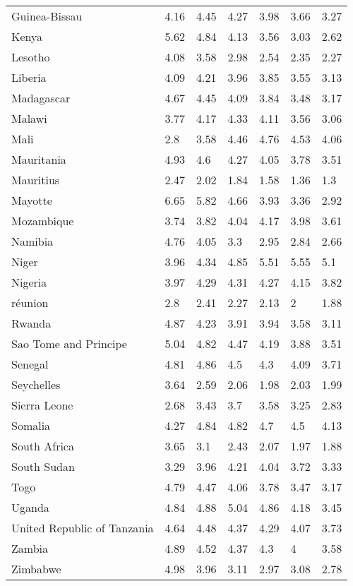 \begin{longtable}[t]{lllllll}
Guinea-Bissau & 4.16 & 4.45 & 4.27 & 3.98 & 3.66 & 3.27\\
Kenya & 5.62 & 4.84 & 4.13 & 3.56 & 3.03 & 2.62\\
Lesotho & 4.08 & 3.58 & 2.98 & 2.54 & 2.35 & 2.27\\
Liberia & 4.09 & 4.21 & 3.96 & 3.85 & 3.55 & 3.13\\
Madagascar & 4.67 & 4.45 & 4.09 & 3.84 & 3.48 & 3.17\\
Malawi & 3.77 & 4.17 & 4.33 & 4.11 & 3.56 & 3.06\\
Mali & 2.8 & 3.58 & 4.46 & 4.76 & 4.53 & 4.06\\
Mauritania & 4.93 & 4.6 & 4.27 & 4.05 & 3.78 & 3.51\\
Mauritius & 2.47 & 2.02 & 1.84 & 1.58 & 1.36 & 1.3\\
Mayotte & 6.65 & 5.82 & 4.66 & 3.93 & 3.36 & 2.92\\
Mozambique & 3.74 & 3.82 & 4.04 & 4.17 & 3.98 & 3.61\\
Namibia & 4.76 & 4.05 & 3.3 & 2.95 & 2.84 & 2.66\\
Niger & 3.96 & 4.34 & 4.85 & 5.51 & 5.55 & 5.1\\
Nigeria & 3.97 & 4.29 & 4.31 & 4.27 & 4.15 & 3.82\\
réunion & 2.8 & 2.41 & 2.27 & 2.13 & 2 & 1.88\\
Rwanda & 4.87 & 4.23 & 3.91 & 3.94 & 3.58 & 3.11\\
Sao Tome and Principe & 5.04 & 4.82 & 4.47 & 4.19 & 3.88 & 3.51\\
Senegal & 4.81 & 4.86 & 4.5 & 4.3 & 4.09 & 3.71\\
Seychelles & 3.64 & 2.59 & 2.06 & 1.98 & 2.03 & 1.99\\
Sierra Leone & 2.68 & 3.43 & 3.7 & 3.58 & 3.25 & 2.83\\
Somalia & 4.27 & 4.84 & 4.82 & 4.7 & 4.5 & 4.13\\
South Africa & 3.65 & 3.1 & 2.43 & 2.07 & 1.97 & 1.88\\
South Sudan & 3.29 & 3.96 & 4.21 & 4.04 & 3.72 & 3.33\\
Togo & 4.79 & 4.47 & 4.06 & 3.78 & 3.47 & 3.17\\
Uganda & 4.84 & 4.88 & 5.04 & 4.86 & 4.18 & 3.45\\
United Republic of Tanzania & 4.64 & 4.48 & 4.37 & 4.29 & 4.07 & 3.73\\
Zambia & 4.89 & 4.52 & 4.37 & 4.3 & 4 & 3.58\\
Zimbabwe & 4.98 & 3.96 & 3.11 & 2.97 & 3.08 & 2.78\\*
\end{longtable}
\endgroup{}
